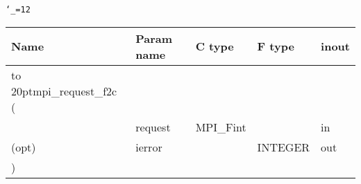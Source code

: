 \begingroup\tt\catcode`\_=12
\begin{tabular}{lllll}
\toprule
\textrm{Name}&\textrm{Param name}&\textrm{C type}&\textrm{F type}&\textrm{inout}\\
\midrule
\hbox to 20pt{mpi_request_f2c (\hss} \\
&request&MPI_Fint&&in\\
(opt)&ierror&&INTEGER&out\\
)\\
\bottomrule
\end{tabular}
\endgroup

